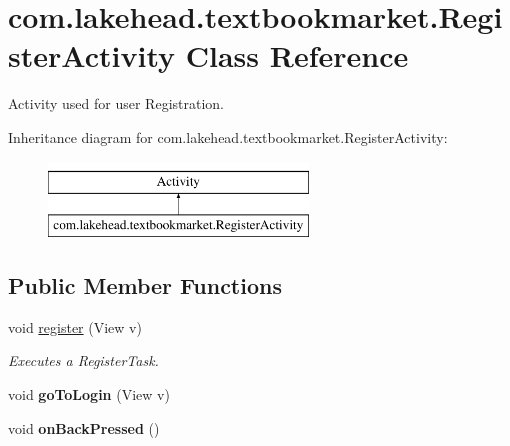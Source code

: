 \hypertarget{classcom_1_1lakehead_1_1textbookmarket_1_1_register_activity}{\section{com.\-lakehead.\-textbookmarket.\-Register\-Activity Class Reference}
\label{classcom_1_1lakehead_1_1textbookmarket_1_1_register_activity}
}


Activity used for user Registration.  


Inheritance diagram for com.\-lakehead.\-textbookmarket.\-Register\-Activity\-:\begin{figure}[H]
\begin{center}
\leavevmode
\includegraphics[height=2.000000cm]{classcom_1_1lakehead_1_1textbookmarket_1_1_register_activity}
\end{center}
\end{figure}
\subsection*{Public Member Functions}
\begin{DoxyCompactItemize}
\item 
void \hyperlink{classcom_1_1lakehead_1_1textbookmarket_1_1_register_activity_ac78779407e7e3eaa0b06b2e0f58996a4}{register} (View v)
\begin{DoxyCompactList}\small\item\em Executes a Register\-Task. \end{DoxyCompactList}\item 
\hypertarget{classcom_1_1lakehead_1_1textbookmarket_1_1_register_activity_ad900b1f726c0bc7239f81c8e16c43c8f}{void {\bfseries go\-To\-Login} (View v)}\label{classcom_1_1lakehead_1_1textbookmarket_1_1_register_activity_ad900b1f726c0bc7239f81c8e16c43c8f}

\item 
\hypertarget{classcom_1_1lakehead_1_1textbookmarket_1_1_register_activity_a5fd60fd7d38b58f3d4ea289983ca3c15}{void {\bfseries on\-Back\-Pressed} ()}\label{classcom_1_1lakehead_1_1textbookmarket_1_1_register_activity_a5fd60fd7d38b58f3d4ea289983ca3c15}

\end{DoxyCompactItemize}
